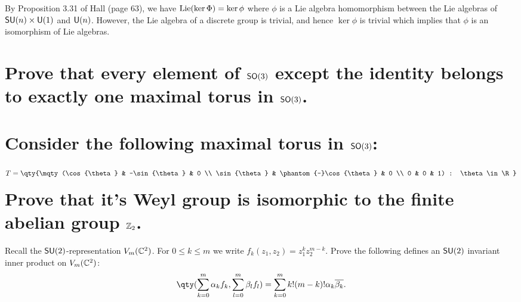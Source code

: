 \documentclass[
	pages,
	boxes,
	color=WildStrawberry
]{homework}
\theoremstyle{plain}
\begin{document}
\begin{solution}
	By Proposition 3.31 of Hall (page 63), we have $\operatorname{Lie}(\ker\Phi) = \ker\phi$ where $\phi$ is a Lie algebra homomorphism between the Lie algebras of $\mathsf{SU}(n)\times\mathsf{U}(1)$ and $\mathsf{U}(n)$. However, the Lie algebra of a discrete group is trivial, and hence $\ker\phi$ is trivial which implies that $\phi$ is an isomorphism of Lie algebras.
\end{solution}

\begin{problem}
\begin{parts}
	\part{Prove that every element of $\mathsf{SO}(3)$ except the identity belongs to exactly one maximal torus in $\mathsf{SO}(3)$.}\label{part:2a}
	\part{Consider the following maximal torus in $\mathsf{SO}(3)$:
		\begin{equation*}
			T = \qty{\mqty(\cos{\theta} & -\sin{\theta} & 0 \\ \sin{\theta} & \phantom{-}\cos{\theta} & 0 \\ 0 & 0 & 1) : \theta\in\R}
		\end{equation*}
		Prove that it's Weyl group is isomorphic to the finite abelian group $\mathbb{Z}_2$.}\label{part:2b}
\end{parts}
\end{problem}

\begin{solution}

\end{solution}

\begin{problem}
Recall the $\mathsf{SU}(2)$-representation $V_m(\mathbb{C}^2)$. For $0\leq k \leq m$ we write $f_k(z_1, z_2) = z_1^k z_2^{m - k}$. Prove the following defines an $\mathsf{SU}(2)$ invariant inner product on $V_m(\mathbb{C}^2)$:
\begin{equation*}
	\qty(\sum_{k = 0}^m \alpha_k f_k, \sum_{l = 0}^m\beta_l f_l) = \sum_{k = 0}^m k!(m - k)!\alpha_k\overline{\beta_k}.
\end{equation*}
\end{problem}

\begin{solution}

\end{solution}
\end{document}
